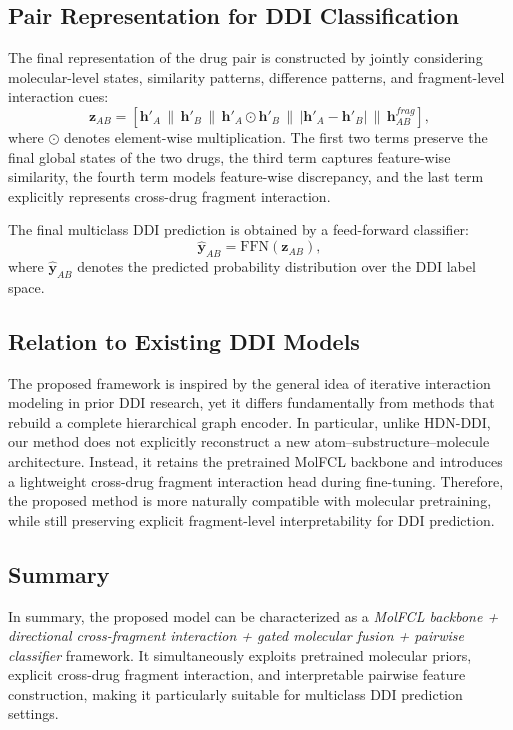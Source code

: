 \subsection{Pair Representation for DDI Classification}

The final representation of the drug pair is constructed by jointly considering molecular-level states, similarity patterns, difference patterns, and fragment-level interaction cues:
\begin{equation}
\mathbf{z}_{AB} =
[
\mathbf{h}'_A \,\|\, 
\mathbf{h}'_B \,\|\, 
\mathbf{h}'_A \odot \mathbf{h}'_B \,\|\, 
|\mathbf{h}'_A - \mathbf{h}'_B| \,\|\, 
\mathbf{h}^{frag}_{AB}
],
\end{equation}
where $\odot$ denotes element-wise multiplication. The first two terms preserve the final global states of the two drugs, the third term captures feature-wise similarity, the fourth term models feature-wise discrepancy, and the last term explicitly represents cross-drug fragment interaction.

The final multiclass DDI prediction is obtained by a feed-forward classifier:
\begin{equation}
\hat{\mathbf{y}}_{AB} = \mathrm{FFN}(\mathbf{z}_{AB}),
\end{equation}
where $\hat{\mathbf{y}}_{AB}$ denotes the predicted probability distribution over the DDI label space.

\subsection{Relation to Existing DDI Models}

The proposed framework is inspired by the general idea of iterative interaction modeling in prior DDI research, yet it differs fundamentally from methods that rebuild a complete hierarchical graph encoder. In particular, unlike HDN-DDI, our method does not explicitly reconstruct a new atom--substructure--molecule architecture. Instead, it retains the pretrained MolFCL backbone and introduces a lightweight cross-drug fragment interaction head during fine-tuning. Therefore, the proposed method is more naturally compatible with molecular pretraining, while still preserving explicit fragment-level interpretability for DDI prediction.

\subsection{Summary}

In summary, the proposed model can be characterized as a \emph{MolFCL backbone + directional cross-fragment interaction + gated molecular fusion + pairwise classifier} framework. It simultaneously exploits pretrained molecular priors, explicit cross-drug fragment interaction, and interpretable pairwise feature construction, making it particularly suitable for multiclass DDI prediction settings.
